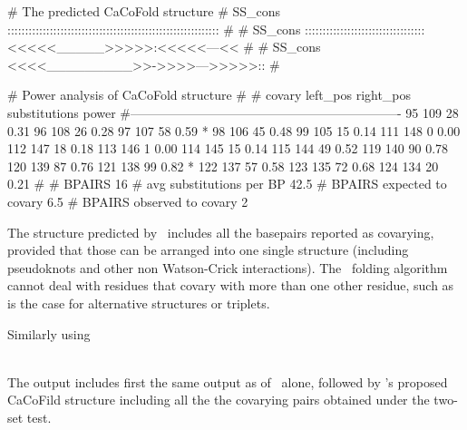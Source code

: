 \begin{sreoutput}
# The predicted CaCoFold structure
# SS_cons ::::::::::::::::::::::::::::::::::::::::::::::::::::::::::::
#
# SS_cons ::::::::::::::::::::::::::::::::::<<<<<_____>>>>>:<<<<<---<<
#
# SS_cons <<<<_________>>->>>>--->>>>>::
#

# Power analysis of CaCoFold structure 
#
# covary  left_pos      right_pos    substitutions      power
#----------------------------------------------------------------
          95		109		28		0.31
          96		108		26		0.28
          97		107		58		0.59
     *    98		106		45		0.48
          99		105		15		0.14
          111		148		0		0.00
          112		147		18		0.18
          113		146		1		0.00
          114		145		15		0.14
          115		144		49		0.52
          119		140		90		0.78
          120		139		87		0.76
          121		138		99		0.82
     *    122		137		57		0.58
          123		135		72		0.68
          124		134		20		0.21
#
# BPAIRS 16
# avg substitutions per BP  42.5
# BPAIRS expected to covary 6.5
# BPAIRS observed to covary 2
\end{sreoutput}

The structure predicted by \rscape\ includes all the basepairs
reported as covarying, provided that those can be arranged into one
single structure (including pseudoknots and other non Watson-Crick
interactions). The \rscape\ folding algorithm cannot deal with
residues that covary with more than one other residue, such as is the case for
alternative structures or triplets.

\noindent
Similarly using

\\

\noindent
The output includes first the same output as  of
\rscape\ alone, followed by \rscape's proposed CaCoFild structure including all the 
the covarying pairs  obtained under the two-set test.

